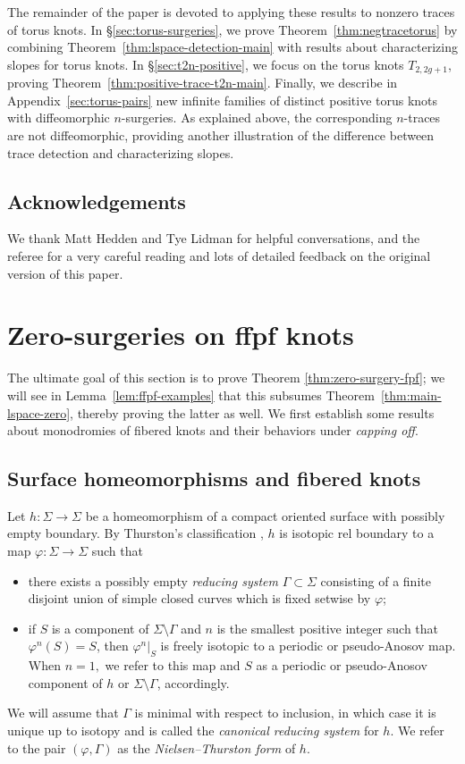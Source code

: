 \documentclass[11pt]{amsart}
\numberwithin{equation}{section}
\numberwithin{theorem}{section}
\theoremstyle{definition}
\begin{document}
The remainder of the paper is devoted to applying these results to nonzero traces of torus knots. In \S\ref{sec:torus-surgeries}, we prove Theorem~\ref{thm:negtracetorus} by combining Theorem~\ref{thm:lspace-detection-main} with   results about characterizing slopes for torus knots.  In \S\ref{sec:t2n-positive}, we focus on the torus knots $T_{2,2g+1}$,   proving Theorem~\ref{thm:positive-trace-t2n-main}. Finally, we describe in  Appendix~\ref{sec:torus-pairs} new infinite families of distinct positive torus knots with diffeomorphic $n$-surgeries. As explained above, the corresponding $n$-traces are not diffeomorphic, providing another illustration of the difference between trace detection and characterizing slopes.


\subsection{Acknowledgements} We thank Matt Hedden and Tye Lidman for helpful conversations, and the referee for a very careful reading and lots of detailed feedback on the original version of this paper.


 

%
%
%
%
%

\section{Zero-surgeries on ffpf knots} \label{sec:veering}
The ultimate goal of this section is to prove Theorem \ref{thm:zero-surgery-fpf}; we will see in Lemma~\ref{lem:ffpf-examples} that this subsumes Theorem~\ref{thm:main-lspace-zero}, thereby proving the latter as well. We first establish some results about monodromies of fibered knots and their behaviors under \emph{capping off}.

\subsection{Surface homeomorphisms and fibered knots}

Let $h:\Sigma\to\Sigma$ be a homeomorphism of a compact oriented surface  with possibly empty boundary. By Thurston's classification \cite{thurston-diffeomorphisms}, $h$ is  isotopic rel boundary to a map $\varphi:\Sigma\to\Sigma$ such that
\begin{itemize}
\item there exists a possibly empty \emph{reducing system} $\Gamma \subset \Sigma$ consisting of a finite disjoint union of simple closed curves which is fixed setwise by $\varphi$;
\item if $S$ is a component of $\Sigma\setminus \Gamma$ and $n$ is the smallest positive integer such that $\varphi^n(S) = S$, then $\varphi^n|_S$ is freely isotopic to a periodic or pseudo-Anosov map. When $n=1,$  we  refer to  this map and $S$ as a periodic or pseudo-Anosov component of $h$ or $\Sigma \setminus \Gamma$, accordingly.
\end{itemize}
We will assume that $\Gamma$ is minimal with respect to inclusion, in which case it  is unique up to isotopy \cite[Theorem~C]{blm} and is called the \emph{canonical reducing system} for $h$. We  refer to the pair $(\varphi,\Gamma)$ as the \emph{Nielsen--Thurston form} of $h$.
\end{document}
